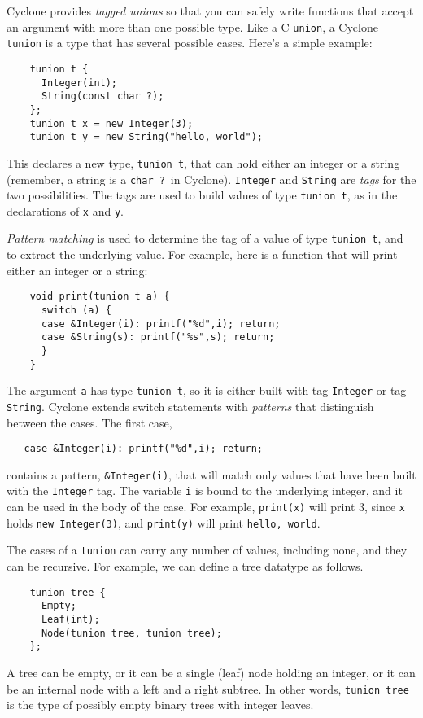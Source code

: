 Cyclone provides \emph{tagged unions} so that you can safely write
functions that accept an argument with more than one possible type.
Like a C \texttt{union}, a Cyclone \texttt{tunion} is a type that has
several possible cases.  Here's a simple example:
\begin{verbatim}
    tunion t {
      Integer(int);
      String(const char ?);
    };
    tunion t x = new Integer(3);
    tunion t y = new String("hello, world");
\end{verbatim}
This declares a new type, \texttt{tunion t}, that can hold either an
integer or a string (remember, a string is a \texttt{char ?}\ in
Cyclone).  \texttt{Integer} and \texttt{String} are \emph{tags} for
the two possibilities.  The tags are used to build values of type
\texttt{tunion t}, as in the declarations of \texttt{x} and
\texttt{y}.

\emph{Pattern matching} is used to determine the tag of a value of
type \texttt{tunion t}, and to extract the underlying value.  For
example, here is a function that will print either an integer or a
string:
\begin{verbatim}
    void print(tunion t a) {
      switch (a) {
      case &Integer(i): printf("%d",i); return;
      case &String(s): printf("%s",s); return;
      }
    }
\end{verbatim}
The argument \texttt{a} has type \texttt{tunion t}, so it is either
built with tag \texttt{Integer} or tag \texttt{String}.  Cyclone
extends switch statements with \emph{patterns} that
distinguish between the cases.  The first case,
\begin{verbatim}
   case &Integer(i): printf("%d",i); return;
\end{verbatim}
contains a pattern, \texttt{\&Integer(i)}, that will match only values
that have been built with the \texttt{Integer} tag.  The variable
\texttt{i} is bound to the underlying integer, and it can be used in
the body of the case.  For example, \texttt{print(x)} will print 3,
since \texttt{x} holds \texttt{new Integer(3)}, and
\texttt{print(y)} will print \texttt{hello, world}.

The cases of a \texttt{tunion} can carry any number of values,
including none, and they can be recursive.  For example, we can define
a tree datatype as follows.
\begin{verbatim}
    tunion tree {
      Empty;
      Leaf(int);
      Node(tunion tree, tunion tree);
    };
\end{verbatim}
A tree can be empty, or it can be a single (leaf) node holding an
integer, or it can be an internal node with a left and a right
subtree.  In other words, \texttt{tunion tree} is the type of possibly
empty binary trees with integer leaves.

